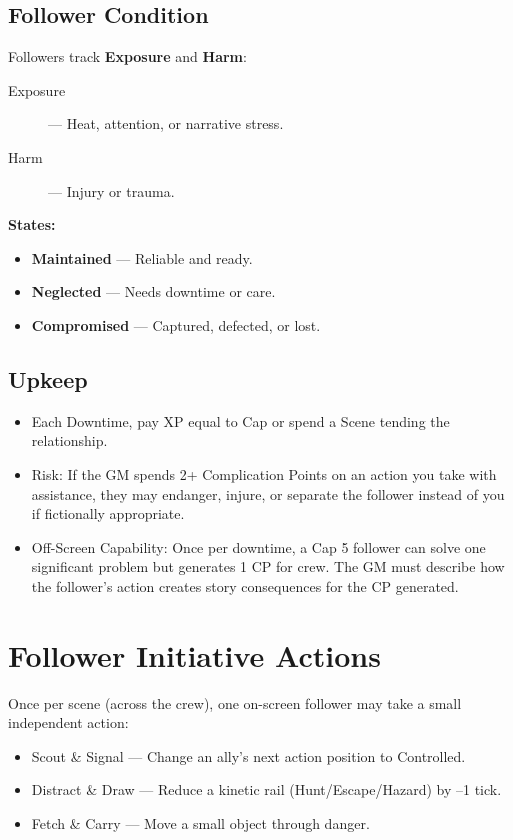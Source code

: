 \subsection*{Follower Condition}

Followers track \textbf{Exposure} and \textbf{Harm}:

\begin{description}
  \item[Exposure] — Heat, attention, or narrative stress.
  \item[Harm] — Injury or trauma.
\end{description}

\textbf{States:}
\begin{itemize}
  \item \textbf{Maintained} — Reliable and ready.
  \item \textbf{Neglected} — Needs downtime or care.
  \item \textbf{Compromised} — Captured, defected, or lost.
\end{itemize}

\subsection*{Upkeep}

\begin{itemize}
  \item Each Downtime, pay XP equal to Cap or spend a Scene tending the relationship.
  \item Risk: If the GM spends 2+ Complication Points  on an action you take with assistance, they may endanger, injure, or separate the follower instead of you if fictionally appropriate.
  \item Off-Screen Capability: Once per downtime, a Cap 5 follower can solve one significant problem but generates 1 CP for crew. The GM must describe how the follower's action creates story consequences for the CP generated.
\end{itemize}

\section{Follower Initiative Actions}

Once per scene (across the crew), one on-screen follower may take a small independent action:

\begin{itemize}
  \item Scout \& Signal — Change an ally's next action position to Controlled.
  \item Distract \& Draw — Reduce a kinetic rail (Hunt/Escape/Hazard) by –1 tick.
  \item Fetch \& Carry — Move a small object through danger.
\end{itemize}

